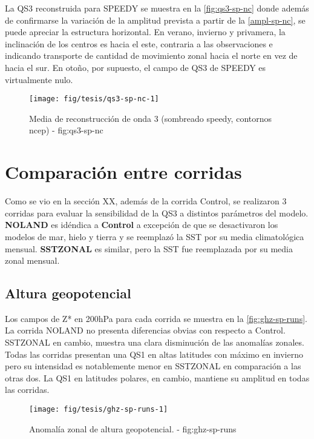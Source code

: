 \documentclass[spanish,a4paper]{book}
\begin{document}
La QS3 reconstruida para SPEEDY se muestra en la \autoref{fig:qs3-sp-nc}
donde además de confirmarse la variación de la amplitud prevista a
partir de la \autoref{ampl-sp-nc}, se puede apreciar la estructura
horizontal. En verano, invierno y privamera, la inclinación de los
centros es hacia el este, contraria a las observaciones e indicando
transporte de cantidad de movimiento zonal hacia el norte en vez de
hacia el sur. En otoño, por supuesto, el campo de QS3 de SPEEDY es
virtualmente nulo.

\begin{figure*}
\texttt{[image: fig/tesis/qs3-sp-nc-1]} \caption{Media de reconstrucción de onda 3 (sombreado speedy, contornos ncep) - fig:qs3-sp-nc}\label{fig:qs3-sp-nc}
\end{figure*}

\section{Comparación entre corridas}\label{comparacion-entre-corridas}

Como se vio en la sección XX, además de la corrida Control, se
realizaron 3 corridas para evaluar la sensibilidad de la QS3 a distintos
parámetros del modelo. \textbf{NOLAND} es idéndica a \textbf{Control} a
excepción de que se desactivaron los modelos de mar, hielo y tierra y se
reemplazó la SST por su media climatológica mensual. \textbf{SSTZONAL}
es similar, pero la SST fue reemplazada por su media zonal mensual.

\subsection{Altura geopotencial}\label{altura-geopotencial-2}

Los campos de Z* en 200hPa para cada corrida se muestra en la
\autoref{fig:ghz-sp-runs}. La corrida NOLAND no presenta diferencias
obvias con respecto a Control. SSTZONAL en cambio, muestra una clara
disminución de las anomalías zonales. Todas las corridas presentan una
QS1 en altas latitudes con máximo en invierno pero su intensidad es
notablemente menor en SSTZONAL en comparación a las otras dos. La QS1 en
latitudes polares, en cambio, mantiene su amplitud en todas las
corridas.

\begin{landscape}\begin{figure}

{\centering \texttt{[image: fig/tesis/ghz-sp-runs-1]} 

}

\caption{Anomalía zonal de altura geopotencial. - fig:ghz-sp-runs}\label{fig:ghz-sp-runs}
\end{figure}
\end{landscape}
\end{document}
